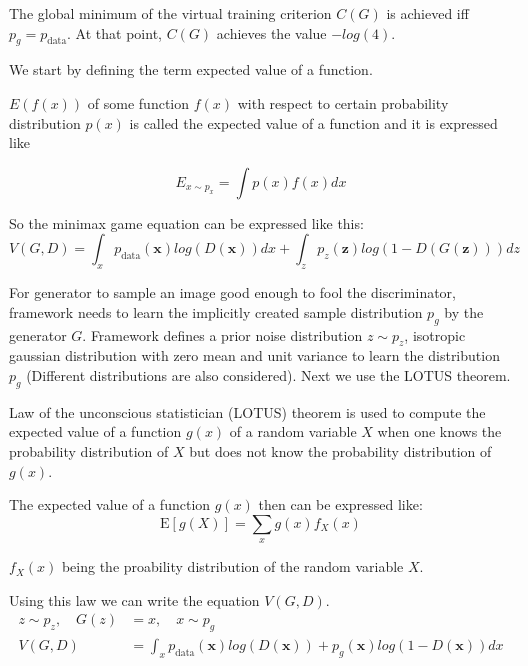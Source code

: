 \begin{theorem}
\label{thr:gan}
The global minimum of the virtual training criterion $C(G)$ is achieved iff $p_g = p_{\text{data}}$.
At that point, $C(G)$ achieves the value $-log(4)$.
\end{theorem} 

We start by defining the term expected value of a function. 

\begin{definition}
    $E(f(x))$ of some function $f(x)$ with respect to  certain probability distribution
$p(x)$ is called the expected value of a function and it is expressed like 
\end{definition}
 
\begin{equation}
    \label{eqn:ev}
    E_{x \sim p_x} = \int p(x) f(x) dx
\end{equation}


So the minimax game equation can be expressed like this: 
\begin{equation}
    \label{eqn:minmax_gan}
    V( G, D) = \int_x p_{\text{data}}(\boldsymbol{x}) log(D(\boldsymbol{x})) dx + \int_z p_z(\boldsymbol{z}) log(1 - D(G(\boldsymbol{z}))) dz
\end{equation}
    

For generator to sample an image good enough to fool the discriminator, framework needs to learn the
implicitly created sample distribution $p_g$ by the generator $G$. Framework defines a prior noise
distribution $z \sim p_z$, isotropic gaussian distribution with zero mean and unit variance to learn
the distribution $p_g$ (Different distributions are also considered). Next we use the LOTUS theorem.

\begin{theorem}
Law of the unconscious statistician (LOTUS) theorem is used to compute the expected value of a 
function $g(x)$ of a random variable $X$  when one knows the probability distribution of $X$ but 
does not know the probability distribution of $g(x)$. \cite{ringner2009law}
\end{theorem}

The expected value of a function $g(x)$ then can be expressed like:
\begin{equation}
    \mathrm{E}[g(X)]=\sum_{x} g(x) f_{X}(x)  
\end{equation}

$f_{X}(x)$ being the proability distribution of the random variable $X$. 

Using this law we can write the equation $V(G, D)$. 
\begin{align}
    z \sim p_z , \quad G(z) &= x, \quad x \sim p_g\\ 
    V( G, D) &= \int_x p_{\text{data}}(\boldsymbol{x}) log(D(\boldsymbol{x})) + p_g(\boldsymbol{x}) log(1 - D(\boldsymbol{x})) dx
\end{align}

